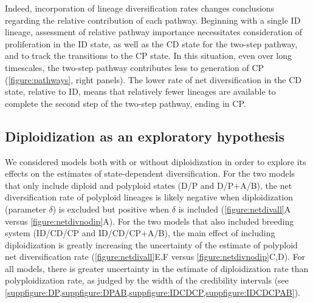 Indeed, incorporation of lineage diversification rates changes conclusions regarding the relative contribution of each pathway.
Beginning with a single ID lineage, assessment of relative pathway importance necessitates consideration of proliferation in the ID state, as well as the CD state for the two-step pathway, and to track the transitions to the CP state.
In this situation, even over long timescales, the two-step pathway contributes less to generation of CP (\cref{figure:pathways}, right panels).
The lower rate of net diversification in the CD state, relative to ID, means that relatively fewer lineages are available to complete the second step of the two-step pathway, ending in CP.

\subsection{Diploidization as an exploratory hypothesis}

We considered models both with or without diploidization in order to explore its effects on the estimates of state-dependent diversification.
For the two models that only include diploid and polyploid states (D/P and D/P+A/B), the net diversification rate of polyploid lineages is likely negative when diploidization (parameter $\delta$) is excluded but positive when $\delta$ is included (\cref{figure:netdivall}A versus \cref{figure:netdivnodip}A).
For the two models that also included breeding system (ID/CD/CP and ID/CD/CP+A/B), the main effect of including diploidization is greatly increasing the uncertainty of the estimate of polyploid net diversification rate (\cref{figure:netdivall}E,F versus \cref{figure:netdivnodip}C,D).
For all models, there is greater uncertainty in the estimate of diploidization rate than polyploidization rate, as judged by the width of the credibility intervals (see \cref{suppfigure:DP,suppfigure:DPAB,suppfigure:IDCDCP,suppfigure:IDCDCPAB}).

